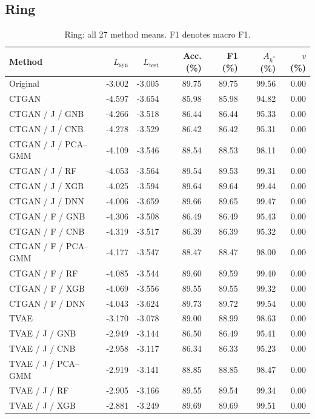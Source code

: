 \documentclass[11pt,letterpaper]{article}
\newcommand{\Lsyn}{L_{\mathrm{syn}}}
\newcommand{\Ltest}{L_{\mathrm{test}}}
\begin{document}
\subsection{Ring}
\begin{table}[H]\centering
\caption{Ring: all 27 method means. F1 denotes macro F1.}\label{tab:all-ring}
\small
\begin{tabular}{lrrrrrr}\toprule
Method & $\Lsyn$ & $\Ltest$ & Acc. (\%) & F1 (\%) & $A_{h^*}$ (\%) & $v$ (\%)\\\midrule
Original & -3.002 & -3.005 & 89.75 & 89.75 & 99.56 & 0.00\\
CTGAN & -4.597 & -3.654 & 85.98 & 85.98 & 94.82 & 0.00\\
CTGAN / J / GNB & -4.266 & -3.518 & 86.44 & 86.44 & 95.33 & 0.00\\
CTGAN / J / CNB & -4.278 & -3.529 & 86.42 & 86.42 & 95.31 & 0.00\\
CTGAN / J / PCA--GMM & -4.109 & -3.546 & 88.54 & 88.53 & 98.11 & 0.00\\
CTGAN / J / RF & -4.053 & -3.564 & 89.54 & 89.53 & 99.31 & 0.00\\
CTGAN / J / XGB & -4.025 & -3.594 & 89.64 & 89.64 & 99.44 & 0.00\\
CTGAN / J / DNN & -4.006 & -3.659 & 89.66 & 89.65 & 99.47 & 0.00\\
CTGAN / F / GNB & -4.306 & -3.508 & 86.49 & 86.49 & 95.43 & 0.00\\
CTGAN / F / CNB & -4.319 & -3.517 & 86.39 & 86.39 & 95.32 & 0.00\\
CTGAN / F / PCA--GMM & -4.177 & -3.547 & 88.47 & 88.47 & 98.00 & 0.00\\
CTGAN / F / RF & -4.085 & -3.544 & 89.60 & 89.59 & 99.40 & 0.00\\
CTGAN / F / XGB & -4.069 & -3.556 & 89.55 & 89.55 & 99.32 & 0.00\\
CTGAN / F / DNN & -4.043 & -3.624 & 89.73 & 89.72 & 99.54 & 0.00\\
TVAE & -3.170 & -3.078 & 89.00 & 88.99 & 98.63 & 0.00\\
TVAE / J / GNB & -2.949 & -3.144 & 86.50 & 86.49 & 95.41 & 0.00\\
TVAE / J / CNB & -2.958 & -3.117 & 86.34 & 86.33 & 95.23 & 0.00\\
TVAE / J / PCA--GMM & -2.919 & -3.141 & 88.85 & 88.85 & 98.47 & 0.00\\
TVAE / J / RF & -2.905 & -3.166 & 89.55 & 89.54 & 99.34 & 0.00\\
TVAE / J / XGB & -2.881 & -3.249 & 89.69 & 89.69 & 99.51 & 0.00\\

\end{tabular}
\end{table}
\end{document}
